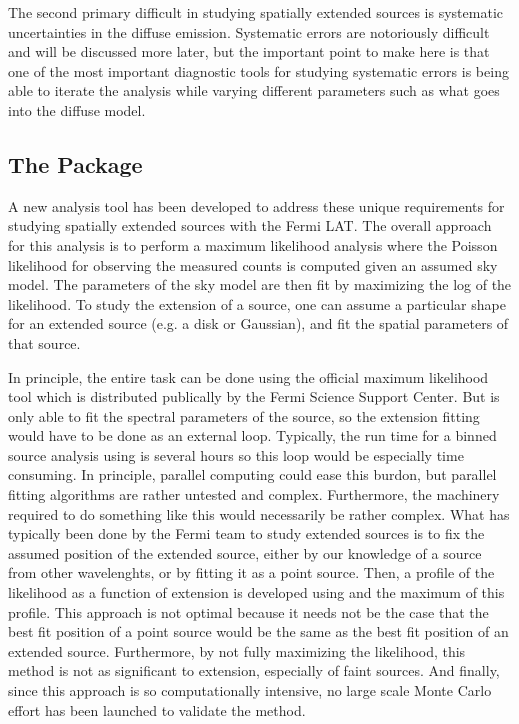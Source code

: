 \documentclass[preprint]{aastex}
\newcommand{\pointlike}{\text{\em pointlike}\xspace}
\newcommand{\gtlike}{\text{\em gtlike}\xspace}
\begin{document}
The second primary difficult in studying spatially extended sources is
systematic uncertainties in the diffuse emission. Systematic errors are
notoriously difficult and will be discussed more later, but the important
point to make here is that one of the most important diagnostic tools for
studying systematic errors is being able to iterate the analysis while
varying different parameters such as what goes into the diffuse model.

\subsection{The \pointlike Package}

A new analysis tool has been developed to address these unique
requirements for studying spatially extended sources with the Fermi
LAT. The overall approach for this analysis is to perform a maximum
likelihood analysis where the Poisson likelihood for observing the
measured counts is computed given an assumed sky model. The parameters
of the sky model are then fit by maximizing the log of the likelihood.
To study the extension of a source, one can assume a particular shape
for an extended source (e.g. a disk or Gaussian), and fit the spatial
parameters of that source.

In principle, the entire task can be done using the 
official maximum likelihood tool \gtlike which is 
distributed publically by the Fermi Science Support Center\cite{fssc}. 
But \gtlike is
only able to fit the spectral parameters of the source, so the extension
fitting would have to be done as an external loop. Typically, the run time
for a binned source analysis using \gtlike is several hours so this loop
would be especially time consuming. In principle, parallel computing could
ease this burdon, but parallel fitting algorithms are rather untested
and complex. Furthermore, the machinery required to do something like
this would necessarily be rather complex. What has typically been done by
the Fermi team to study extended sources is to fix the assumed position
of the extended source, either by our knowledge of a source from other
wavelenghts, or by fitting it as a point source. Then, a profile of the
likelihood as a function of extension is developed using \gtlike
and the maximum of this profile. This approach is not optimal because it
needs not be the case that the best fit position of a point source would
be the same as the best fit position of an extended source. Furthermore,
by not fully maximizing the likelihood, this method is not as significant to
extension, especially of faint sources. And finally, since this approach
is so computationally intensive, no large scale Monte Carlo effort has been
launched to validate the method.
\end{document}
